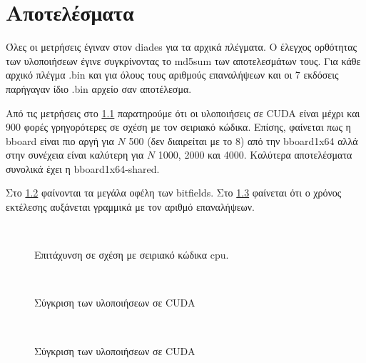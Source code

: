 \chapter{Αποτελέσματα}

Όλες οι μετρήσεις έγιναν στον diades για τα αρχικά πλέγματα.
Ο έλεγχος ορθότητας των υλοποιήσεων έγινε συγκρίνοντας το md5sum των αποτελεσμάτων τους.
Για κάθε αρχικό πλέγμα .bin και για όλους τους αριθμούς επαναλήψεων και οι 7 εκδόσεις παρήγαγαν ίδιο .bin αρχείο σαν αποτέλεσμα.

Από τις μετρήσεις στο \hyperref[fig:speedup]{\figurename{} \ref{fig:speedup}}
παρατηρούμε ότι οι υλοποιήσεις σε CUDA είναι μέχρι και 900 φορές γρηγορότερες σε σχέση με τον σειριακό κώδικα.
Επίσης, φαίνεται πως η bboard είναι πιο αργή για $N$ 500 (δεν διαιρείται με το 8) από την bboard1x64 αλλά στην συνέχεια είναι καλύτερη για $N$ 1000, 2000 και 4000.
Καλύτερα αποτελέσματα συνολικά έχει η bboard1x64-shared.

Στο \hyperref[fig:cuda-N]{\figurename{} \ref{fig:cuda-N}} φαίνονται τα μεγάλα οφέλη των bitfields.
Στο \hyperref[fig:cuda-iter]{\figurename{} \ref{fig:cuda-iter}} φαίνεται ότι ο χρόνος εκτέλεσης αυξάνεται γραμμικά με τον αριθμό επαναλήψεων.

\begin{figure}[h]
\centering
{}\
\
\
\caption{Επιτάχυνση σε σχέση με σειριακό κώδικα cpu.}
\label{fig:speedup}
\end{figure}

\begin{figure}[h]
\centering
{}\
\
\
\caption{Σύγκριση των υλοποιήσεων σε CUDA}
\label{fig:cuda-N}
\end{figure}


\begin{figure}[h]
\centering
{}
\
\
\caption{Σύγκριση των υλοποιήσεων σε CUDA}
\label{fig:cuda-iter}
\end{figure}